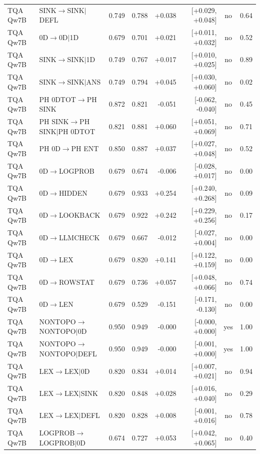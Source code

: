 \begin{longtable}{llrrrrcc}
TQA Qw7B & SINK$\to$SINK$\mid$DEFL & 0.749 & 0.788 & +0.038 & [+0.029, +0.048] & no & 0.64 \\
TQA Qw7B & 0D$\to$0D$\mid$1D & 0.679 & 0.701 & +0.021 & [+0.011, +0.032] & no & 0.52 \\
TQA Qw7B & SINK$\to$SINK$\mid$1D & 0.749 & 0.767 & +0.017 & [+0.010, +0.025] & no & 0.89 \\
TQA Qw7B & SINK$\to$SINK$\mid$ANS & 0.749 & 0.794 & +0.045 & [+0.030, +0.060] & no & 0.02 \\
TQA Qw7B & PH 0DTOT$\to$PH SINK & 0.872 & 0.821 & -0.051 & [-0.062, -0.040] & no & 0.45 \\
TQA Qw7B & PH SINK$\to$PH SINK$\mid$PH 0DTOT & 0.821 & 0.881 & +0.060 & [+0.051, +0.069] & no & 0.71 \\
TQA Qw7B & PH 0D$\to$PH ENT & 0.850 & 0.887 & +0.037 & [+0.027, +0.048] & no & 0.52 \\
TQA Qw7B & 0D$\to$LOGPROB & 0.679 & 0.674 & -0.006 & [-0.028, +0.017] & no & 0.00 \\
TQA Qw7B & 0D$\to$HIDDEN & 0.679 & 0.933 & +0.254 & [+0.240, +0.268] & no & 0.09 \\
TQA Qw7B & 0D$\to$LOOKBACK & 0.679 & 0.922 & +0.242 & [+0.229, +0.256] & no & 0.17 \\
TQA Qw7B & 0D$\to$LLMCHECK & 0.679 & 0.667 & -0.012 & [-0.027, +0.004] & no & 0.00 \\
TQA Qw7B & 0D$\to$LEX & 0.679 & 0.820 & +0.141 & [+0.122, +0.159] & no & 0.00 \\
TQA Qw7B & 0D$\to$ROWSTAT & 0.679 & 0.736 & +0.057 & [+0.048, +0.066] & no & 0.74 \\
TQA Qw7B & 0D$\to$LEN & 0.679 & 0.529 & -0.151 & [-0.171, -0.130] & no & 0.00 \\
TQA Qw7B & NONTOPO$\to$NONTOPO$\mid$0D & 0.950 & 0.949 & -0.000 & [-0.000, +0.000] & yes & 1.00 \\
TQA Qw7B & NONTOPO$\to$NONTOPO$\mid$DEFL & 0.950 & 0.949 & -0.000 & [-0.001, +0.000] & yes & 1.00 \\
TQA Qw7B & LEX$\to$LEX$\mid$0D & 0.820 & 0.834 & +0.014 & [+0.007, +0.021] & no & 0.94 \\
TQA Qw7B & LEX$\to$LEX$\mid$SINK & 0.820 & 0.848 & +0.028 & [+0.016, +0.040] & no & 0.29 \\
TQA Qw7B & LEX$\to$LEX$\mid$DEFL & 0.820 & 0.828 & +0.008 & [-0.001, +0.016] & no & 0.78 \\
TQA Qw7B & LOGPROB$\to$LOGPROB$\mid$0D & 0.674 & 0.727 & +0.053 & [+0.042, +0.065] & no & 0.40 \\

\end{longtable}
